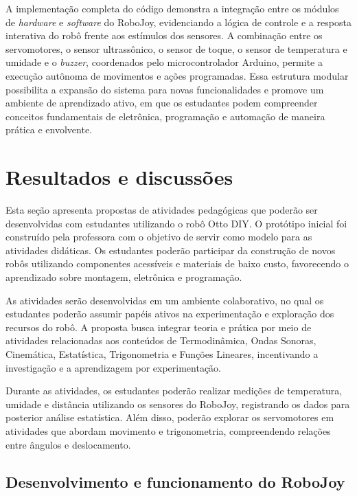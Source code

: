 \documentclass[portuguese]{textolivre}
\begin{document}
A implementação completa do código demonstra a integração entre os módulos de \textit{hardware} e \textit{software} do RoboJoy, evidenciando a lógica de controle e a resposta interativa do robô frente aos estímulos dos sensores. A combinação entre os servomotores, o sensor ultrassônico, o sensor de toque, o sensor de temperatura e umidade e o \textit{buzzer}, coordenados pelo microcontrolador Arduino, permite a execução autônoma de movimentos e ações programadas. Essa estrutura modular possibilita a expansão do sistema para novas funcionalidades e promove um ambiente de aprendizado ativo, em que os estudantes podem compreender conceitos fundamentais de eletrônica, programação e automação de maneira prática e envolvente.


\section{Resultados e discussões}\label{sec-resultados}

Esta seção apresenta propostas de atividades pedagógicas que poderão ser desenvolvidas com estudantes utilizando o robô Otto DIY. O protótipo inicial foi construído pela professora com o objetivo de servir como modelo para as atividades didáticas. Os estudantes poderão participar da construção de novos robôs utilizando componentes acessíveis e materiais de baixo custo, favorecendo o aprendizado sobre montagem, eletrônica e programação.

As atividades serão desenvolvidas em um ambiente colaborativo, no qual os estudantes poderão assumir papéis ativos na experimentação e exploração dos recursos do robô. A proposta busca integrar teoria e prática por meio de atividades relacionadas aos conteúdos de Termodinâmica, Ondas Sonoras, Cinemática, Estatística, Trigonometria e Funções Lineares, incentivando a investigação e a aprendizagem por experimentação.

Durante as atividades, os estudantes poderão realizar medições de temperatura, umidade e distância utilizando os sensores do RoboJoy, registrando os dados para posterior análise estatística. Além disso, poderão explorar
os servomotores em atividades que abordam movimento e trigonometria, compreendendo relações entre ângulos e deslocamento.

\subsection{Desenvolvimento e funcionamento do RoboJoy}
\end{document}
